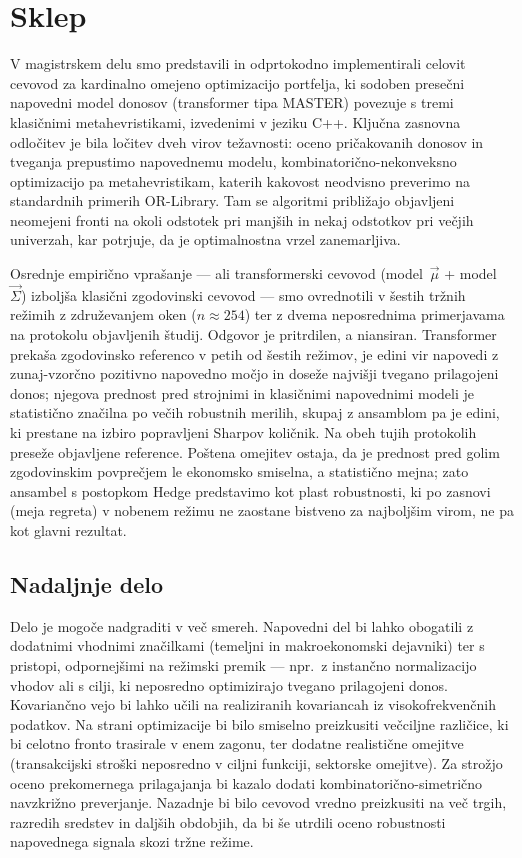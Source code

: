 \chapter{Sklep}
\label{ch:sklep}

V magistrskem delu smo predstavili in odprtokodno implementirali celovit cevovod za kardinalno omejeno optimizacijo portfelja, ki sodoben presečni napovedni model donosov (transformer tipa MASTER) povezuje s tremi klasičnimi metahevristikami, izvedenimi v jeziku C++. Ključna zasnovna odločitev je bila ločitev dveh virov težavnosti: oceno pričakovanih donosov in tveganja prepustimo napovednemu modelu, kombinatorično-nekonveksno optimizacijo pa metahevristikam, katerih kakovost neodvisno preverimo na standardnih primerih OR-Library. Tam se algoritmi približajo objavljeni neomejeni fronti na okoli odstotek pri manjših in nekaj odstotkov pri večjih univerzah, kar potrjuje, da je optimalnostna vrzel zanemarljiva.

Osrednje empirično vprašanje --- ali transformerski cevovod (model~$\vec{\mu}$ + model~$\vec{\Sigma}$) izboljša klasični zgodovinski cevovod --- smo ovrednotili v šestih tržnih režimih z združevanjem oken ($n\approx 254$) ter z dvema neposrednima primerjavama na protokolu objavljenih študij. Odgovor je pritrdilen, a niansiran. Transformer prekaša zgodovinsko referenco v petih od šestih režimov, je edini vir napovedi z zunaj-vzorčno pozitivno napovedno močjo in doseže najvišji tvegano prilagojeni donos; njegova prednost pred strojnimi in klasičnimi napovednimi modeli je statistično značilna po večih robustnih merilih, skupaj z ansamblom pa je edini, ki prestane na izbiro popravljeni Sharpov količnik. Na obeh tujih protokolih preseže objavljene reference. Poštena omejitev ostaja, da je prednost pred golim zgodovinskim povprečjem le ekonomsko smiselna, a statistično mejna; zato ansambel s postopkom Hedge predstavimo kot plast robustnosti, ki po zasnovi (meja regreta) v nobenem režimu ne zaostane bistveno za najboljšim virom, ne pa kot glavni rezultat.

\section{Nadaljnje delo}
\label{sec:future}

Delo je mogoče nadgraditi v več smereh. Napovedni del bi lahko obogatili z dodatnimi vhodnimi značilkami (temeljni in makroekonomski dejavniki) ter s pristopi, odpornejšimi na režimski premik --- npr.\ z instančno normalizacijo vhodov ali s cilji, ki neposredno optimizirajo tvegano prilagojeni donos. Kovariančno vejo bi lahko učili na realiziranih kovariancah iz visokofrekvenčnih podatkov. Na strani optimizacije bi bilo smiselno preizkusiti večciljne različice, ki bi celotno fronto trasirale v enem zagonu, ter dodatne realistične omejitve (transakcijski stroški neposredno v ciljni funkciji, sektorske omejitve). Za strožjo oceno prekomernega prilagajanja bi kazalo dodati kombinatorično-simetrično navzkrižno preverjanje. Nazadnje bi bilo cevovod vredno preizkusiti na več trgih, razredih sredstev in daljših obdobjih, da bi še utrdili oceno robustnosti napovednega signala skozi tržne režime.
